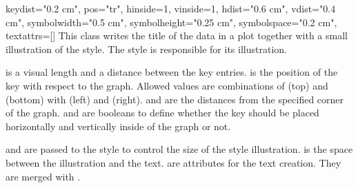 \begin{classdesc}{key}{dist="0.2 cm", pos="tr", hinside=1, vinside=1,
                       hdist="0.6 cm", vdist="0.4 cm",
                       symbolwidth="0.5 cm", symbolheight="0.25 cm",
                       symbolspace="0.2 cm", textattrs=[]}
  This class writes the title of the data in a plot together with a
  small illustration of the style. The style is responsible for its
  illustration.

   is a visual length and a distance between the key
  entries.  is the position of the key with respect to the
  graph. Allowed values are combinations of  (top) and
   (bottom) with  (left) and  (right).
   and  are the distances from the specified
  corner of the graph.  and  are booleans to
  define whether the key should be placed horizontally and vertically
  inside of the graph or not.

   and  are passed to the style to
  control the size of the style illustration.  is the
  space between the illustration and the text.  are
  attributes for the text creation. They are merged with
  .
\end{classdesc}
